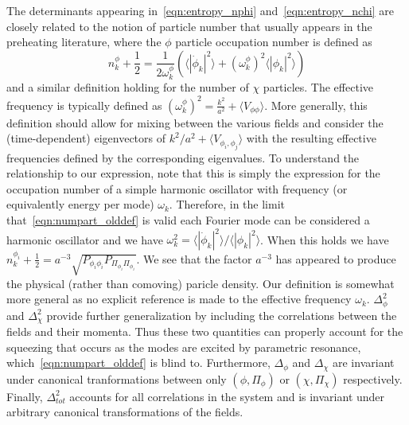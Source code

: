 \documentclass[11pt,a4paper]{article}
\begin{document}
The determinants appearing in~\eqref{eqn:entropy_nphi} and~\eqref{eqn:entropy_nchi} are closely related to the notion of particle number that usually appears in the preheating literature, 
where the $\phi$ particle occupation number is defined as
\begin{equation}
  n^{\phi}_k + \frac{1}{2} = \frac{1}{2\omega^{\phi}_k}\left(\langle|\dot{\phi}_k|^2\rangle + (\omega_k^\phi)^2\langle|\phi_k|^2\rangle\right)
  \label{eqn:numpart_olddef}
\end{equation}
and a similar definition holding for the number of $\chi$ particles.
The effective frequency is typically defined as $(\omega_k^\phi)^2 = \frac{k^2}{a^2} + \langle V_{\phi\phi} \rangle$.
More generally, this definition should allow for mixing between the various fields and consider the (time-dependent) eigenvectors of $k^2/a^2 + \langle V_{\phi_i,\phi_j}\rangle$ with the resulting effective frequencies defined by the corresponding eigenvalues. 
To understand the relationship to our expression, note that this is simply the expression for the occupation number of a simple harmonic oscillator with frequency (or equivalently energy per mode) $\omega_k$.
Therefore, in the limit that~\eqref{eqn:numpart_olddef} is valid each Fourier mode can be considered a harmonic oscillator and we have $\omega_k^2 = \langle|\dot{\phi}_k|^2\rangle/\langle|\phi_k|^2\rangle$.
When this holds we have $n_k^{\phi_i} +\frac{1}{2} = a^{-3}\sqrt{P_{\phi_i\phi_i}P_{\Pi_{\phi_i}\Pi_{\phi_i}}}$.
We see that the factor $a^{-3}$ has appeared to produce the physical (rather than comoving) paricle density.
Our definition is somewhat more general as no explicit reference is made to the effective frequency $\omega_k$.
$\Delta_\phi^2$ and $\Delta_\chi^2$ provide further generalization by including the correlations between the fields and their momenta.
Thus these two quantities can properly account for the squeezing that occurs as the modes are excited by parametric resonance, which~\eqref{eqn:numpart_olddef} is blind to.
Furthermore, $\Delta_\phi$ and $\Delta_\chi$ are invariant under canonical tranformations between only $(\phi,\Pi_\phi)$ or $(\chi,\Pi_\chi)$ respectively.
Finally, $\Delta_{tot}^2$ accounts for all correlations in the system and is invariant under arbitrary canonical transformations of the fields.
\end{document}
